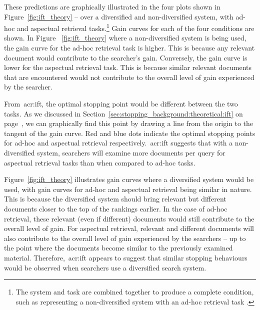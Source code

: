 These predictions are graphically illustrated in the four plots shown in Figure~\ref{fig:ift_theory} -- over a diversified  and non-diversified  system, with ad-hoc  and aspectual  retrieval tasks.\footnote{The system and task are combined together to produce a complete condition, such as  representing a non-diversified system  with an ad-hoc retrieval task .} Gain curves for each of the four conditions are shown. In Figure ~\ref{fig:ift_theory}  where a non-diversified system is being used, the gain curve for the ad-hoc retrieval task is higher. This is because any relevant document would contribute to the searcher's gain. Conversely, the gain curve is lower for the aspectual retrieval task. This is because similar relevant documents that are encountered would not contribute to the overall level of gain experienced by the searcher.

From~\gls{acr:ift}, the optimal stopping point would be different between the two tasks. As we discussed in Section~\ref{sec:stopping_background:theoretical:ift} on page~\pageref{sec:stopping_background:theoretical:ift}, we can graphically find this point by drawing a line from the origin to the tangent of the gain curve. Red and blue dots indicate the optimal stopping points for ad-hoc and aspectual retrieval respectively.~\gls{acr:ift} suggests that with a non-diversified system, searchers will examine more documents per query for aspectual retrieval tasks than when compared to ad-hoc tasks.

Figure~\ref{fig:ift_theory}  illustrates gain curves where a diversified system would be used, with gain curves for ad-hoc and aspectual retrieval being similar in nature. This is because the diversified system should bring relevant but different documents closer to the top of the rankings earlier. In the case of ad-hoc retrieval, these relevant (even if different) documents would still contribute to the overall level of gain. For aspectual retrieval, relevant and different documents will also contribute to the overall level of gain experienced by the searchers -- up to the point where the documents become similar to the previously examined material. Therefore,~\gls{acr:ift} appears to suggest that similar stopping behaviours would be observed when searchers use a diversified search system.

